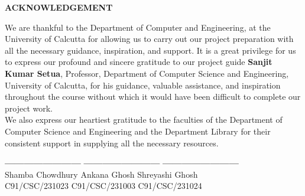 \begin{center}
    {\large {\bf ACKNOWLEDGEMENT}}
\end{center}

We are thankful to the Department of Computer and Engineering, at the University of Calcutta for allowing us to carry out our project preparation with all the necessary guidance, inspiration, and support. It is a great privilege for us to express our profound and sincere gratitude to our project guide  \textbf{Sanjit Kumar Setua}, Professor, Department of Computer Science and Engineering, University of Calcutta, for his guidance, valuable assistance, and inspiration throughout the course without which it would have been difficult to complete our project work. \\
We also express our heartiest gratitude to the faculties of the Department of Computer Science and Engineering and the Department Library for their consistent support in supplying all the necessary resources. \\

\vspace{10em}

\textbf{------------------------} \hfill \hfill \textbf{------------------------}  \hfill \hfill \textbf{------------------------} \\
\hspace*{.2in} Shamba Chowdhury \hspace*{.9in} Ankana Ghosh \hspace*{1.1in} Shreyashi Ghosh \\
\hspace*{.22in}  C91/CSC/231023 \hspace*{1in} C91/CSC/231003 \hspace*{0.9in} C91/CSC/231024